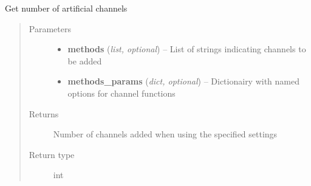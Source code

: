 \documentclass[letterpaper,10pt,english]{sphinxmanual}
\begin{document}
\begin{fulllineitems}
\label{classification:flamingo.classification.channels.get_number_channels}
Get number of artificial channels
\begin{quote}\begin{description}
\item[{Parameters}] \leavevmode\begin{itemize}
\item {} 
\textbf{methods} (\emph{list, optional}) -- List of strings indicating channels to be added

\item {} 
\textbf{methods\_params} (\emph{dict, optional}) -- Dictionairy with named options for channel functions

\end{itemize}

\item[{Returns}] \leavevmode
Number of channels added when using the specified settings

\item[{Return type}] \leavevmode
int

\end{description}\end{quote}

\end{fulllineitems}

\end{document}
